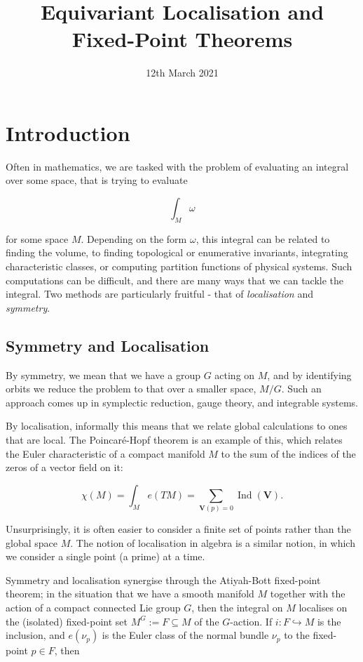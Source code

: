 \documentclass{article}
\title{Equivariant Localisation and Fixed-Point Theorems}
\date{12th March 2021}	%
\newcommand{\w}{\omega}
\DeclareMathOperator{\Ind}{Ind}
\begin{document}
\maketitle

\begin{abstract}


\end{abstract}

\section{Introduction}

Often in mathematics, we are tasked with the problem of evaluating an integral over some space, that is trying to evaluate

$$ \int_{M}\w $$

for some space $M$. Depending on the form $\w$, this integral can be related to finding the volume, to finding topological or enumerative invariants, integrating characteristic classes, or computing partition functions of physical systems. Such computations can be difficult, and there are many ways that we can tackle the integral. Two methods are particularly fruitful - that of \emph{localisation} and \emph{symmetry}.

\subsection{Symmetry and Localisation}

By symmetry, we mean that we have a group $G$ acting on $M$, and by identifying orbits we reduce the problem to that over a smaller space, $M/G$. Such an approach comes up in symplectic reduction, gauge theory, and integrable systems.

By localisation, informally this means that we relate global calculations to ones that are local. The Poincaré-Hopf theorem is an example of this, which relates the Euler characteristic of a compact manifold $M$ to the sum of the indices of the zeros of a vector field on it:

$$ \chi(M) = \int_{M} e(TM) = \sum\limits_{\mathbf{V}(p)=0} \Ind(\mathbf{V}). $$

Unsurprisingly, it is often easier to consider a finite set of points rather than the global space $M$. The notion of localisation in algebra is a similar notion, in which we consider a single point (a prime) at a time.

Symmetry and localisation synergise through the Atiyah-Bott fixed-point theorem; in the situation that we have a smooth manifold $M$ together with the action of a compact connected Lie group $G$, then the integral on $M$ localises on the (isolated) fixed-point set $M^{G} := F \subseteq M$ of the $G$-action. If $i : F \hookrightarrow M$ is the inclusion, and $e(\nu_{p})$ is the Euler class of the normal bundle $\nu_{p}$ to the fixed-point $p \in F$, then
\end{document}
